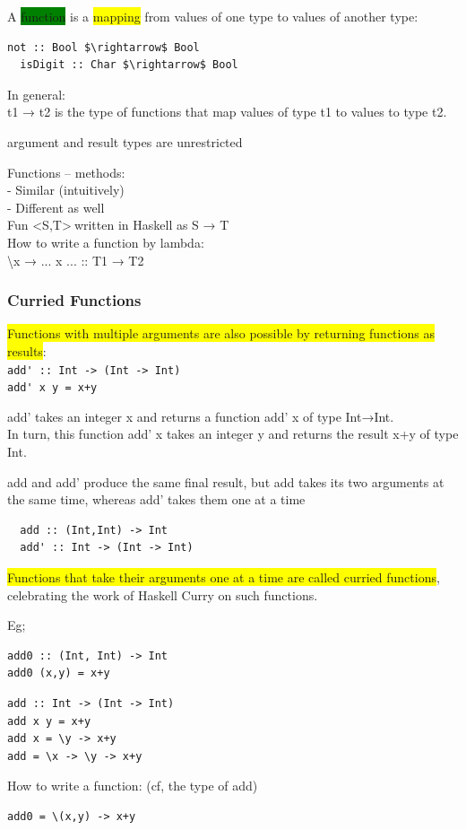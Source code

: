 \documentclass[tikz,border=10pt]{project_plan}
\begin{document}
A \colorbox{green}{function} is a \colorbox{yellow}{mapping} from values of one type to
values of another type:
\begin{lstlisting}[mathescape]
  not :: Bool $\rightarrow$ Bool
  isDigit :: Char $\rightarrow$ Bool
\end{lstlisting}

In general:\\
t1 → t2 is the type of functions that map values of
type t1 to values to type t2.

argument and result types are unrestricted

Functions – methods:\\
- Similar (intuitively)\\
- Different as well\\
Fun \textless S,T\textgreater$\ $written in Haskell as S → T\\
How to write a function by lambda:\\
\textbackslash x → ... x ... :: T1 → T2

\subsubsection{Curried Functions}

\colorbox{yellow}{Functions with multiple arguments are also possible by returning functions as results}:\\
\lstinline|add' :: Int -> (Int -> Int)|\\
\lstinline|add' x y = x+y|

add' takes an integer x and returns a function add' x of type Int→Int.\\
In turn, this function add’ x takes an integer y and returns the result x+y of type Int.

add and add' produce the same final result, but add
takes its two arguments at the same time, whereas add’
takes them one at a time
\begin{lstlisting}
  add :: (Int,Int) -> Int
  add' :: Int -> (Int -> Int)
\end{lstlisting}
\colorbox{yellow}{Functions that take their arguments one at a time are
  called curried functions}, celebrating the work of Haskell
Curry on such functions.

Eg;
\begin{lstlisting}
add0 :: (Int, Int) -> Int
add0 (x,y) = x+y
\end{lstlisting}
\begin{lstlisting}
add :: Int -> (Int -> Int)
add x y = x+y
add x = \y -> x+y
add = \x -> \y -> x+y
\end{lstlisting}
How to write a function: (cf, the type of add)
\begin{lstlisting}
add0 = \(x,y) -> x+y
\end{lstlisting}
\end{document}
